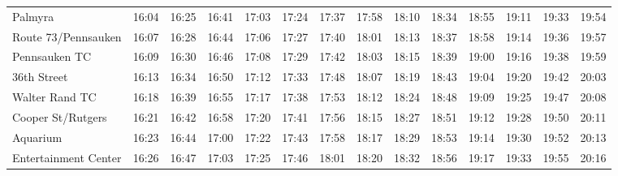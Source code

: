 \begin{center}
\begin{tabular}{@{}lrrrrrrrrrrrrr@{}}
Palmyra & 16:04 & 16:25 & 16:41 & 17:03 & 17:24 & 17:37 & 17:58 & 18:10 & 18:34 & 18:55 & 19:11 & 19:33 & 19:54 \\
Route 73/Pennsauken & 16:07 & 16:28 & 16:44 & 17:06 & 17:27 & 17:40 & 18:01 & 18:13 & 18:37 & 18:58 & 19:14 & 19:36 & 19:57 \\
Pennsauken TC & 16:09 & 16:30 & 16:46 & 17:08 & 17:29 & 17:42 & 18:03 & 18:15 & 18:39 & 19:00 & 19:16 & 19:38 & 19:59 \\
36th Street & 16:13 & 16:34 & 16:50 & 17:12 & 17:33 & 17:48 & 18:07 & 18:19 & 18:43 & 19:04 & 19:20 & 19:42 & 20:03 \\
Walter Rand TC & 16:18 & 16:39 & 16:55 & 17:17 & 17:38 & 17:53 & 18:12 & 18:24 & 18:48 & 19:09 & 19:25 & 19:47 & 20:08 \\
Cooper St/Rutgers & 16:21 & 16:42 & 16:58 & 17:20 & 17:41 & 17:56 & 18:15 & 18:27 & 18:51 & 19:12 & 19:28 & 19:50 & 20:11 \\
Aquarium & 16:23 & 16:44 & 17:00 & 17:22 & 17:43 & 17:58 & 18:17 & 18:29 & 18:53 & 19:14 & 19:30 & 19:52 & 20:13 \\
Entertainment Center & 16:26 & 16:47 & 17:03 & 17:25 & 17:46 & 18:01 & 18:20 & 18:32 & 18:56 & 19:17 & 19:33 & 19:55 & 20:16 \\
\bottomrule\end{tabular}\end{center}
